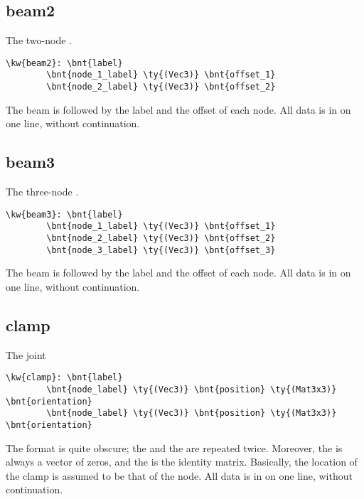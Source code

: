 \subsection{beam2}
The two-node .
\begin{Verbatim}[commandchars=\\\{\}]
    \kw{beam2}: \bnt{label}
        \bnt{node_1_label} \ty{(Vec3)} \bnt{offset_1}
        \bnt{node_2_label} \ty{(Vec3)} \bnt{offset_2}
\end{Verbatim}
The beam  is followed by the label and the offset of each node.
All data is in on one line, without continuation.

\subsection{beam3}
The three-node .
\begin{Verbatim}[commandchars=\\\{\}]
    \kw{beam3}: \bnt{label}
        \bnt{node_1_label} \ty{(Vec3)} \bnt{offset_1}
        \bnt{node_2_label} \ty{(Vec3)} \bnt{offset_2}
        \bnt{node_3_label} \ty{(Vec3)} \bnt{offset_3}
\end{Verbatim}
The beam  is followed by the label and the offset of each node.
All data is in on one line, without continuation.

\subsection{clamp}
The  joint
\begin{Verbatim}[commandchars=\\\{\}]
    \kw{clamp}: \bnt{label}
        \bnt{node_label} \ty{(Vec3)} \bnt{position} \ty{(Mat3x3)} \bnt{orientation}
        \bnt{node_label} \ty{(Vec3)} \bnt{position} \ty{(Mat3x3)} \bnt{orientation}
\end{Verbatim}
The format is quite obscure; the  and the 
are repeated twice.
Moreover, the  is always a vector of zeros,
and the  is the identity matrix.
Basically, the location of the clamp is assumed to be that of the node.
All data is in on one line, without continuation.

